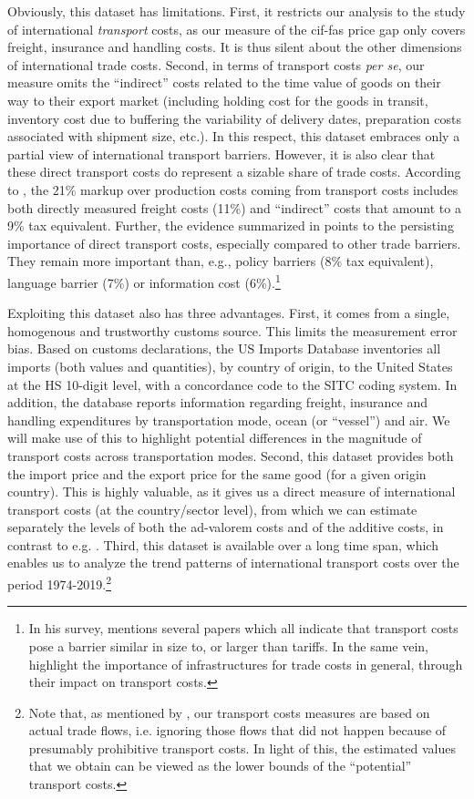 \documentclass[a4paper,11pt]{article}
\begin{document}
Obviously, this dataset has limitations.
First, it restricts our analysis to the study of international \emph{transport} costs, as our measure of the cif-fas price gap only covers freight, insurance and handling costs.
It is thus silent about the other dimensions of international trade costs.
Second, in terms of transport costs \textit{per se}, our measure omits the ``indirect'' costs related to the time value of goods on their way to their export market (including holding cost for the goods in transit, inventory cost due to buffering the variability of delivery dates, preparation costs associated with shipment size, etc.).
In this respect, this dataset embraces only a partial view of international transport barriers.
However, it is also clear that these direct transport costs do represent a sizable share of trade costs.
According to \cite{anderson_wincoop_jel}, the 21\% markup over production costs coming from transport costs includes both directly measured freight costs (11\%) and ``indirect'' costs that amount to a  9\% tax equivalent.
Further, the evidence summarized in \cite{anderson_wincoop_jel} points to the persisting importance of direct transport costs, especially compared to other trade barriers.
They remain more important than, e.g., policy barriers (8\% tax equivalent), language barrier (7\%) or information cost (6\%).\footnote{In his survey, \cite{Hummels_1999} mentions several papers which all indicate that transport costs pose a barrier similar in size to, or larger than tariffs.
In the same vein, \cite{limao_venables} highlight the importance of infrastructures for trade costs in general, through their impact on transport costs.}

Exploiting this dataset also has three advantages.
First, it comes from a single, homogenous and trustworthy customs source.
This limits the measurement error bias.
Based on customs declarations, the US Imports Database inventories all imports (both values and quantities), by country of origin, to the United States at the HS 10-digit level, with a concordance code to the SITC coding system. In addition, the database reports information regarding freight, insurance and handling expenditures by transportation mode, ocean (or ``vessel'') and air. We will make use of this to highlight potential differences in the magnitude of transport costs across transportation modes.
Second, this dataset provides both the import price and the export price for the same good (for a given origin country).
This is highly valuable, as it gives us a direct measure of international transport costs (at the country/sector level), from which we can estimate separately the levels of both the ad-valorem costs and of the additive costs, in contrast to e.g. \cite{Irrazabal_2015}.
Third, this dataset is available over a long time span, which enables us to analyze the trend patterns of international transport costs over the period 1974-2019.\footnote{Note that, as mentioned by \cite{Lafourcade_Thisse}, our transport costs measures are based on actual trade flows, i.e. ignoring those flows that did not happen because of presumably prohibitive transport costs.
In light of this, the estimated values that we obtain can be viewed as the lower bounds of the ``potential'' transport costs.} \smallskip
\end{document}
